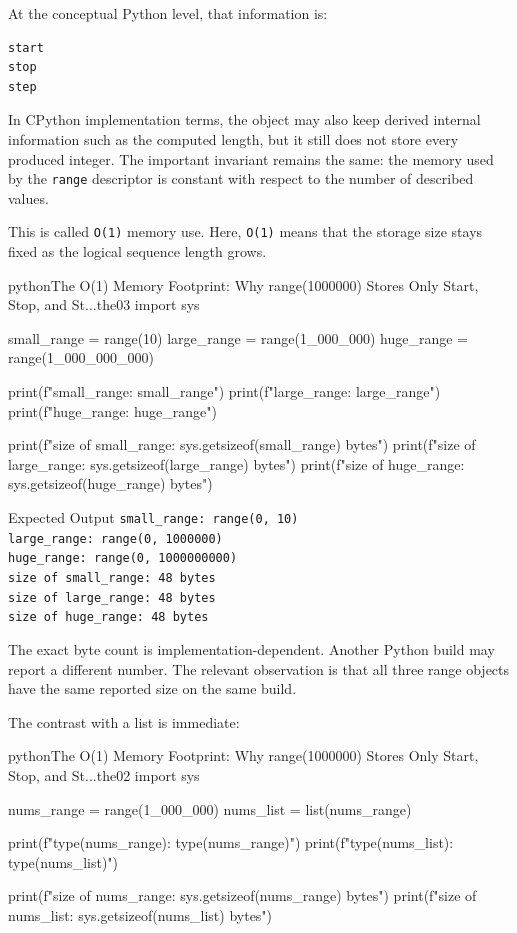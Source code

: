 \documentclass[a4paper,twoside]{report}
\begin{document}
At the conceptual Python level, that information is:

\begin{verbatim}
start
stop
step
\end{verbatim}

In CPython implementation terms, the object may also keep derived internal information such as the computed length, but it still does not store every produced integer. The important invariant remains the same: the memory used by the \texttt{range} descriptor is constant with respect to the number of described values.

This is called \texttt{O(1)} memory use. Here, \texttt{O(1)} means that the storage size stays fixed as the logical sequence length grows.

\begin{codebox}[]{python}{The O(1) Memory Footprint: Why range(1000000) Stores Only Start, Stop, and St...}{the03}
import sys

small_range = range(10)
large_range = range(1_000_000)
huge_range = range(1_000_000_000)

print(f"small_range: {small_range}")
print(f"large_range: {large_range}")
print(f"huge_range:  {huge_range}")

print(f"size of small_range: {sys.getsizeof(small_range)} bytes")
print(f"size of large_range: {sys.getsizeof(large_range)} bytes")
print(f"size of huge_range:  {sys.getsizeof(huge_range)} bytes")
\end{codebox}


\begin{iobox}{Expected Output}
\texttt{small\_range: range(0, 10)} \\
\texttt{large\_range: range(0, 1000000)} \\
\texttt{huge\_range:  range(0, 1000000000)} \\
\texttt{size of small\_range: 48 bytes} \\
\texttt{size of large\_range: 48 bytes} \\
\texttt{size of huge\_range:  48 bytes} \\
\end{iobox}


The exact byte count is implementation-dependent. Another Python build may report a different number. The relevant observation is that all three range objects have the same reported size on the same build.

The contrast with a list is immediate:

\begin{codebox}[]{python}{The O(1) Memory Footprint: Why range(1000000) Stores Only Start, Stop, and St...}{the02}
import sys

nums_range = range(1_000_000)
nums_list = list(nums_range)

print(f"type(nums_range): {type(nums_range)}")
print(f"type(nums_list): {type(nums_list)}")

print(f"size of nums_range: {sys.getsizeof(nums_range)} bytes")
print(f"size of nums_list:  {sys.getsizeof(nums_list)} bytes")
\end{codebox}
\end{document}
